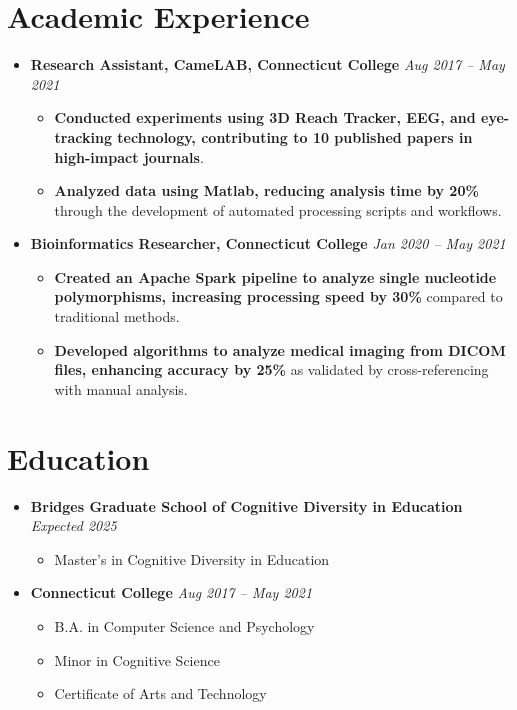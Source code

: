 \documentclass[a4paper,10pt]{article}
\begin{document}
\section*{Academic Experience}
\begin{itemize}[leftmargin=0cm, itemsep=0pt]
    \item \textbf{Research Assistant, CameLAB, Connecticut College}
        \hfill \textit{Aug 2017 – May 2021}
        \begin{itemize}[leftmargin=0.5cm, itemsep=0pt]
            \item \textbf{Conducted experiments using 3D Reach Tracker, EEG, and eye-tracking technology, contributing to 10 published papers in high-impact journals}.
            \item \textbf{Analyzed data using Matlab, reducing analysis time by 20\%} through the development of automated processing scripts and workflows.
        \end{itemize}

    \item \textbf{Bioinformatics Researcher, Connecticut College}
        \hfill \textit{Jan 2020 – May 2021}
        \begin{itemize}[leftmargin=0.5cm, itemsep=0pt]
            \item \textbf{Created an Apache Spark pipeline to analyze single nucleotide polymorphisms, increasing processing speed by 30\%} compared to traditional methods.
            \item \textbf{Developed algorithms to analyze medical imaging from DICOM files, enhancing accuracy by 25\%} as validated by cross-referencing with manual analysis.
        \end{itemize}
\end{itemize}

\section*{Education}
\begin{itemize}[leftmargin=0cm, itemsep=0pt]
    \item \textbf{Bridges Graduate School of Cognitive Diversity in Education}
        \hfill \textit{Expected 2025}
        \begin{itemize}[leftmargin=0.5cm, itemsep=0pt]
            \item Master's in Cognitive Diversity in Education
        \end{itemize}
    \item \textbf{Connecticut College}
        \hfill \textit{Aug 2017 – May 2021}
        \begin{itemize}[leftmargin=0.5cm, itemsep=0pt]
            \item B.A. in Computer Science and Psychology
            \item Minor in Cognitive Science
            \item Certificate of Arts and Technology
        \end{itemize}
\end{itemize}
\end{document}
